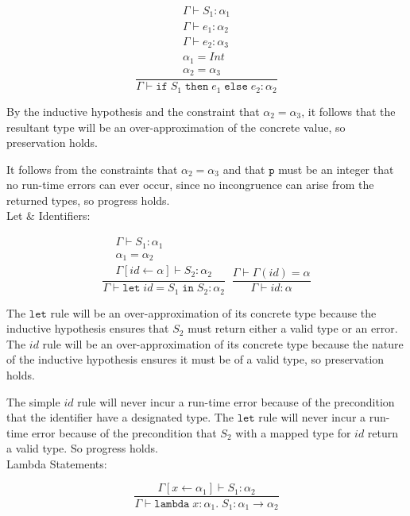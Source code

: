 \documentclass[10pt]{article} %
\begin{document}
\begin{enumerate}
$$\frac{\begin{matrix} \Gamma \vdash S_1 : \alpha_1 \\ \Gamma \vdash e_1: \alpha_2 \\ \Gamma \vdash e_2: \alpha_3 \\ \alpha_1 = Int \\ \alpha_2 = \alpha_3\end{matrix}}{\Gamma \vdash \texttt{if}\; S_1\; \texttt{then}\; e_1\; \texttt{else}\; e_2 : \alpha_2} $$

By the inductive hypothesis and the constraint that $\alpha_2 = \alpha_3$, it follows that the resultant type will be an over-approximation of the concrete value, so preservation holds.

It follows from the constraints that $\alpha_2 = \alpha_3$ and that $\texttt{p}$ must be an integer that no run-time errors can ever occur, since no incongruence can arise from the returned types, so progress holds.\\

Let $\&$ Identifiers:

$$\frac{\begin{matrix}\Gamma \vdash S_1: \alpha_1 \\ \alpha_1 = \alpha_2 \\ \Gamma[id \gets \alpha] \vdash S_2 : \alpha_2\end{matrix}}{\Gamma \vdash \texttt{let}\;id = S_1\; \texttt{in}\;S_2: \alpha_2}\;\;
\frac{\Gamma \vdash \Gamma(id) = \alpha}{\Gamma \vdash id: \alpha}$$

The $\texttt{let}$ rule will be an over-approximation of its concrete type because the inductive hypothesis ensures that $S_2$ must return either a valid type or an error.  The $id$ rule will be an over-approximation of its concrete type because the nature of the inductive hypothesis ensures it must be of a valid type, so preservation holds.

The simple $id$ rule will never incur a run-time error because of the precondition that the identifier have a designated type.  The $\texttt{let}$ rule will never incur a run-time error because of the precondition that $S_2$ with a mapped type for $id$ return a valid type.  So progress holds.\\

Lambda Statements:

$$\frac{\Gamma[x \gets \alpha_1] \vdash S_1: \alpha_2}{\Gamma \vdash \texttt{lambda}\; x: \alpha_1 .\; S_1: \alpha_1 \to \alpha_2} $$


\end{enumerate}
\end{document}
